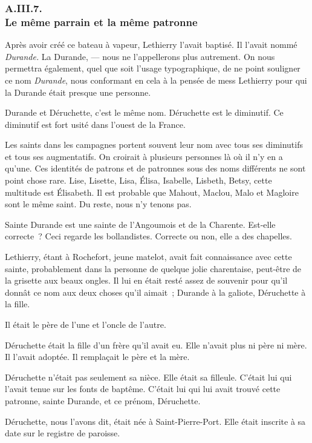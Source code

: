 \documentclass[french,twoside]{book} %
\begin{document}
 \subsubsection[{A.III.7. Le même parrain et la même patronne}]{A.III.7. \\
Le même parrain et la même patronne}
\noindent Après avoir créé ce bateau à vapeur, Lethierry l’avait baptisé. Il l’avait nommé \emph{Durande.} La Durande, — nous ne l’appellerons plus autrement. On nous permettra également, quel que soit l’usage typographique, de ne point souligner ce nom \emph{Durande}, nous conformant en cela à la pensée de mess Lethierry pour qui la Durande était presque une personne.\par
Durande et Déruchette, c’est le même nom. Déruchette est le diminutif. Ce diminutif est fort usité dans l’ouest de la France.\par
Les saints dans les campagnes portent souvent leur nom avec tous ses diminutifs et tous ses augmentatifs. On croirait à plusieurs personnes là où il n’y en a qu’une. Ces identités de patrons et de patronnes sous des noms différents ne sont point chose rare. Lise, Lisette, Lisa, Élisa, Isabelle, Lisbeth, Betsy, cette multitude est Élisabeth. Il est probable que Mahout, Maclou, Malo et Magloire sont le même saint. Du reste, nous n’y tenons pas.\par
 Sainte Durande est une sainte de l’Angoumois et de la Charente. Est-elle correcte ? Ceci regarde les bollandistes. Correcte ou non, elle a des chapelles.\par
Lethierry, étant à Rochefort, jeune matelot, avait fait connaissance avec cette sainte, probablement dans la personne de quelque jolie charentaise, peut-être de la grisette aux beaux ongles. Il lui en était resté assez de souvenir pour qu’il donnât ce nom aux deux choses qu’il aimait ; Durande à la galiote, Déruchette à la fille.\par
Il était le père de l’une et l’oncle de l’autre.\par
Déruchette était la fille d’un frère qu’il avait eu. Elle n’avait plus ni père ni mère. Il l’avait adoptée. Il remplaçait le père et la mère.\par
Déruchette n’était pas seulement sa nièce. Elle était sa filleule. C’était lui qui l’avait tenue sur les fonts de baptême. C’était lui qui lui avait trouvé cette patronne, sainte Durande, et ce prénom, Déruchette.\par
Déruchette, nous l’avons dit, était née à Saint-Pierre-Port. Elle était inscrite à sa date sur le registre de paroisse.\par
\end{document}
